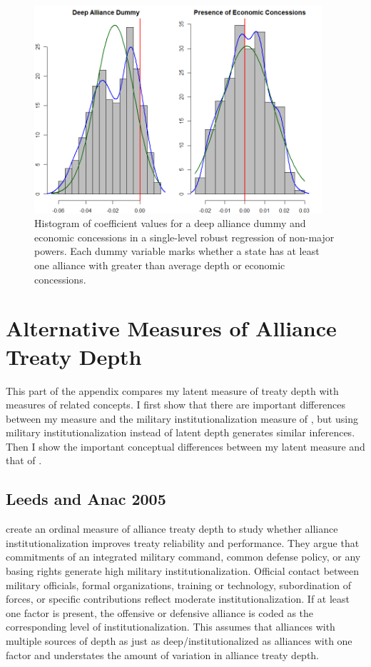 \documentclass[12pt]{article}
\begin{document}
\begin{figure}[htbp]
	\centering
		\includegraphics[width=0.95\textwidth]{eba-single-level.png}
	\caption{Histogram of coefficient values for a deep alliance dummy and economic concessions in a single-level robust regression of non-major powers. Each dummy variable marks whether a state has at least one alliance with greater than average depth or economic concessions.}
	\label{fig:eba-single-level}
\end{figure}




\section{Alternative Measures of Alliance Treaty Depth}

This part of the appendix compares my latent measure of treaty depth with measures of related concepts.  
I first show that there are important differences between my measure and the military institutionalization measure of \citet{LeedsAnac2005}, but using military institutionalization instead of latent depth generates similar inferences. 
Then I show the important conceptual differences between my latent measure and that of \citet{BensonClinton2016}.


\subsection{Leeds and Anac 2005}


\citet{LeedsAnac2005} create an ordinal measure of alliance treaty depth to study whether alliance institutionalization improves treaty reliability and performance. 
They argue that commitments of an integrated military command, common defense policy, or any basing rights generate high military institutionalization. 
Official contact between military officials, formal organizations, training or technology, subordination of forces, or specific contributions reflect moderate institutionalization. 
If at least one factor is present, the offensive or defensive alliance is coded as the corresponding level of institutionalization. 
This assumes that alliances with multiple sources of depth as just as deep/institutionalized as alliances with one factor and understates the amount of variation in alliance treaty depth. 
\end{document}
